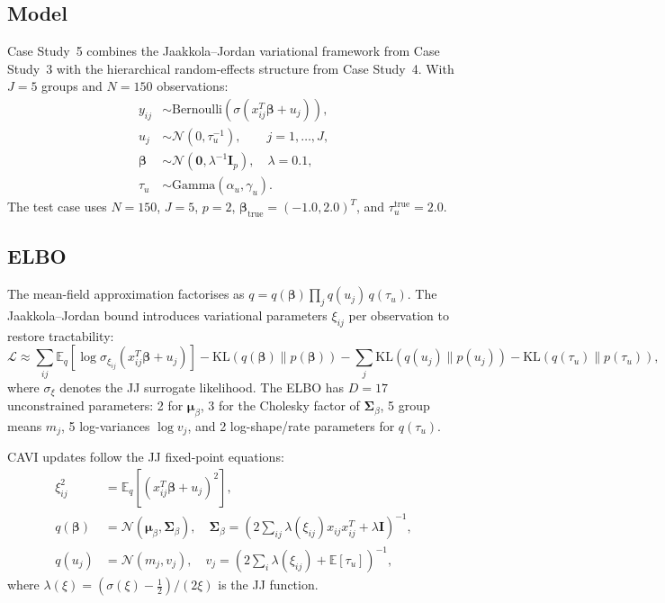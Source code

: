 \documentclass[11pt,a4paper]{article}
\newcommand{\E}{\mathbb{E}}
\newcommand{\N}{\mathcal{N}}
\begin{document}
\subsection{Model}

Case Study~5 combines the Jaakkola--Jordan variational framework from Case Study~3
with the hierarchical random-effects structure from Case Study~4.
With $J=5$ groups and $N=150$ observations:
\begin{align}
  y_{ij} &\sim \mathrm{Bernoulli}\!\left(\sigma(x_{ij}^T\bm{\beta} + u_j)\right), \\
  u_j &\sim \N(0, \tau_u^{-1}), \qquad j = 1,\ldots,J, \\
  \bm{\beta} &\sim \N(\bm{0}, \lambda^{-1}\bm{I}_p), \quad \lambda = 0.1, \\
  \tau_u &\sim \mathrm{Gamma}(\alpha_u, \gamma_u).
\end{align}
The test case uses $N=150$, $J=5$, $p=2$, $\bm{\beta}_{\mathrm{true}}=(-1.0,2.0)^T$,
and $\tau_u^{\mathrm{true}}=2.0$.

\subsection{ELBO}

The mean-field approximation factorises as
$q = q(\bm{\beta})\prod_j q(u_j)\,q(\tau_u)$.
The Jaakkola--Jordan bound introduces variational parameters $\xi_{ij}$ per
observation to restore tractability:
\begin{equation}
  \mathcal{L} \approx \sum_{ij} \E_q[\log \sigma_{\xi_{ij}}(x_{ij}^T\bm{\beta}+u_j)]
    - \mathrm{KL}(q(\bm{\beta})\|p(\bm{\beta}))
    - \sum_j \mathrm{KL}(q(u_j)\|p(u_j))
    - \mathrm{KL}(q(\tau_u)\|p(\tau_u)),
\end{equation}
where $\sigma_\xi$ denotes the JJ surrogate likelihood.
The ELBO has $D=17$ unconstrained parameters: 2 for $\bm{\mu}_\beta$, 3 for the
Cholesky factor of $\bm{\Sigma}_\beta$, 5 group means $m_j$, 5 log-variances
$\log v_j$, and 2 log-shape/rate parameters for $q(\tau_u)$.

CAVI updates follow the JJ fixed-point equations:
\begin{align}
  \xi_{ij}^2 &= \E_q[(x_{ij}^T\bm{\beta}+u_j)^2], \\
  q(\bm{\beta}) &= \N(\bm{\mu}_\beta, \bm{\Sigma}_\beta), \quad
    \bm{\Sigma}_\beta = \left(2\sum_{ij}\lambda(\xi_{ij})x_{ij}x_{ij}^T + \lambda\bm{I}\right)^{-1}, \\
  q(u_j) &= \N(m_j, v_j), \quad
    v_j = \left(2\sum_i \lambda(\xi_{ij}) + \E[\tau_u]\right)^{-1},
\end{align}
where $\lambda(\xi) = (\sigma(\xi)-\tfrac{1}{2})/(2\xi)$ is the JJ function.
\end{document}
